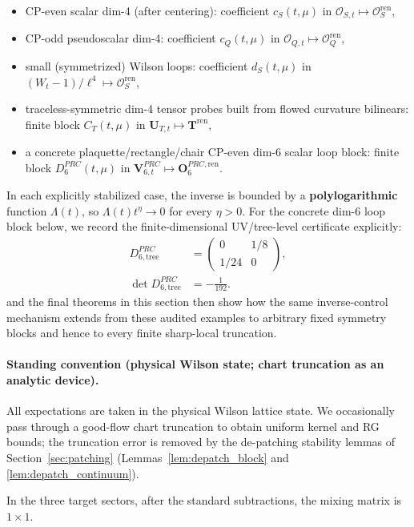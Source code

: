 \medskip
\begin{itemize}
\item CP-even scalar dim-4 (after centering): coefficient $c_S(t,\mu)$ in $\mathcal O_{S,t}\mapsto \mathcal O_S^{\mathrm{ren}}$,
\item CP-odd pseudoscalar dim-4: coefficient $c_Q(t,\mu)$ in $\mathcal O_{Q,t}\mapsto \mathcal O_Q^{\mathrm{ren}}$,
\item small (symmetrized) Wilson loops: coefficient $d_S(t,\mu)$ in $(W_t-1)/\ell^4\mapsto \mathcal O_S^{\mathrm{ren}}$,
\item traceless-symmetric dim-4 tensor probes built from flowed curvature bilinears: finite block $C_T(t,\mu)$ in $\mathbf U_{T,t}\mapsto \mathbf T^{\mathrm{ren}}$,
\item a concrete plaquette/rectangle/chair CP-even dim-$6$ scalar loop block: finite block $D_6^{PRC}(t,\mu)$ in $\mathbf V_{6,t}^{PRC}\mapsto \mathbf O_{6}^{PRC,\mathrm{ren}}$.
\end{itemize}
In each explicitly stabilized case, the inverse is bounded by a \textbf{polylogarithmic} function $\Lambda(t)$,
so $\Lambda(t)t^\eta\to 0$ for every $\eta>0$.
For the concrete dim-$6$ loop block below, we record the finite-dimensional UV/tree-level certificate explicitly:
\[
\begin{aligned}
D_{6,\mathrm{tree}}^{PRC}
&=
\begin{pmatrix}
0 & 1/8\\[0.15em]
1/24 & 0
\end{pmatrix},\\
\det D_{6,\mathrm{tree}}^{PRC}
&=-\frac{1}{192}.
\end{aligned}
\]
and the final theorems in this section then show how the same inverse-control mechanism extends from these audited examples to arbitrary fixed symmetry blocks and hence to every finite sharp-local truncation.

\paragraph{Standing convention (physical Wilson state; chart truncation as an analytic device).}
All expectations are taken in the physical Wilson lattice state.  We occasionally pass through a good-flow chart truncation
to obtain uniform kernel and RG bounds; the truncation error is removed by the de-patching stability lemmas of
Section~\ref{sec:patching} (Lemmas~\ref{lem:depatch_block} and \ref{lem:depatch_continuum}).

In the three target sectors, after the standard subtractions, the mixing matrix is $1\times 1$.

